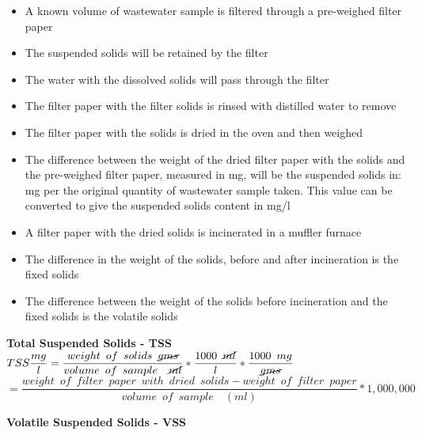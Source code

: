 \begin{itemize}
\setlength\itemsep{1em}
					\item A known volume of wastewater sample is filtered through a pre-weighed filter paper
					\item The suspended solids will be retained by the filter
					\item The water with the dissolved solids will pass through the filter
					\item The filter paper with the filter solids is rinsed with distilled water to remove 
					\item The filter paper with the solids is dried in the oven and then weighed
					\item The difference between the weight of the dried filter paper with the solids and the pre-weighed filter paper, measured in mg, will be the suspended solids in: mg per the original quantity of wastewater sample taken.  This value can be converted to give the suspended solids content in mg/l
					\item A filter paper with the dried solids is incinerated in a muffler furnace
					\item The difference in the weight of the solids, before and after incineration is the fixed solids
					\item The difference between the weight of the solids before incineration and the fixed solids is the volatile solids
	\end{itemize}				

\textbf{Total Suspended Solids - TSS}
\vspace{0.4cm}
$TSS \dfrac{mg}{l}=\dfrac{weight \enspace of \enspace solids \enspace \cancel{gms}}{volume \enspace of \enspace sample \enspace \enspace \cancel{ml}}*\dfrac{1000 \enspace \cancel{ml}}{l}*\dfrac{1000 \enspace mg}{\cancel{gms}}$\\
\vspace{0.3cm}
\hspace{1.4cm}$=\dfrac{weight \enspace of \enspace filter \enspace paper  \enspace with \enspace dried  \enspace solids - weight \enspace of \enspace filter \enspace paper}{volume \enspace of \enspace sample \enspace \enspace (ml)}*1,000,000$\\
\vspace{0.4cm}

\vspace{0.4cm}
\textbf{Volatile Suspended Solids - VSS}	
\vspace{0.4cm}

